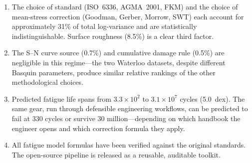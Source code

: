\documentclass[12pt,a4paper]{article}
\begin{document}
\begin{enumerate}
  \item The choice of standard (ISO~6336, AGMA~2001, FKM) and the choice
        of mean-stress correction (Goodman, Gerber, Morrow, SWT) each
        account for approximately 31\% of total log-variance and are
        statistically indistinguishable. Surface roughness (8.5\%) is a
        clear third factor.
  \item The S--N curve source (0.7\%) and cumulative damage rule (0.5\%)
        are negligible in this regime---the two Waterloo datasets, despite
        different Basquin parameters, produce similar relative rankings of
        the other methodological choices.
  \item Predicted fatigue life spans from $3.3\times10^2$ to
        $3.1\times10^7$ cycles (5.0~dex). The same gear, run through
        defensible engineering workflows, can be predicted to fail at
        330 cycles or survive 30 million---depending on which handbook
        the engineer opens and which correction formula they apply.
  \item All fatigue model formulas have been verified against the
        original standards. The open-source pipeline is released as a
        reusable, auditable toolkit.
\end{enumerate}
\end{document}
